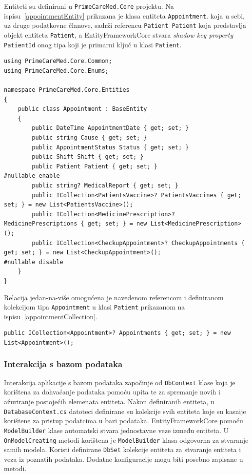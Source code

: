 Entiteti su definirani u \texttt{PrimeCareMed.Core} projektu.
Na ispisu~\ref{appointmentEntity} prikazana je klasa entiteta \texttt{Appointment}. koja u sebi, uz druge podatkovne članove, sadrži referencu \texttt{Patient Patient} koja predstavlja objekt entiteta \texttt{Patient}, a EntityFrameworkCore stvara \textit{shadow key property} \texttt{PatientId} onog tipa koji je primarni ključ u klasi \texttt{Patient}. 
\begin{lstlisting}[caption={Entitet Appointment}, label=appointmentEntity]
using PrimeCareMed.Core.Common;
using PrimeCareMed.Core.Enums;

namespace PrimeCareMed.Core.Entities
{
    public class Appointment : BaseEntity
    {
        public DateTime AppointmentDate { get; set; }
        public string Cause { get; set; }
        public AppointmentStatus Status { get; set; }
        public Shift Shift { get; set; }
        public Patient Patient { get; set; }
#nullable enable
        public string? MedicalReport { get; set; }
        public ICollection<PatientsVaccine>? PatientsVaccines { get; set; } = new List<PatientsVaccine>();
        public ICollection<MedicinePrescription>? MedicinePrescriptions { get; set; } = new List<MedicinePrescription>();
        public ICollection<CheckupAppointment>? CheckupAppointments { get; set; } = new List<CheckupAppointment>();
#nullable disable
    }
}
\end{lstlisting}
Relacija jedan-na-više\cite{oneToMany} omogućena je navedenom referencom i definiranom kolekcijom tipa \texttt{Appointment} u klasi \texttt{Patient} prikazanom na ispisu~\ref{appointmentCollection}.
\begin{lstlisting}[caption={Kolekcija Appointment objekata u klasi Patient}, label=appointmentCollection]
public ICollection<Appointment>? Appointments { get; set; } = new List<Appointment>();
\end{lstlisting}

\subsubsection{Interakcija s bazom podataka}
Interakcija aplikacije s bazom podataka započinje od \texttt{DbContext} klase koja je korištena za dohvaćanje podataka pomoću upita te za spremanje novih i ažuriranje postojećih elemenata entiteta. Nakon definiranih entiteta, u \texttt{DatabaseContext.cs} datoteci definirane su kolekcije svih entiteta koje su kasnije korištene za pristup podatcima u bazi podataka. EntityFrameworkCore pomoću \texttt{ModelBuilder} klase automatski stvara jednostavne veze između entiteta. U \texttt{OnModelCreating} metodi korištena je \texttt{ModelBuilder} klasa odgovorna za stvaranje samih modela. Koristi definirane \texttt{DbSet} kolekcije entiteta za stvaranje entiteta i veza iz poznatih podataka. Dodatne konfiguracije mogu biti posebno zapisane u metodi.

